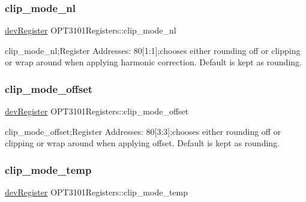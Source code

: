 \mbox{\label{class_o_p_t3101_registers_a8fe822abe308283298bd3fbbc718bedc}} 
\subsubsection{\texorpdfstring{clip\+\_\+mode\+\_\+nl}{clip\_mode\_nl}}
{\footnotesize\ttfamily \mbox{\hyperlink{classdev_register}{dev\+Register}} O\+P\+T3101\+Registers\+::clip\+\_\+mode\+\_\+nl}



clip\+\_\+mode\+\_\+nl;Register Addresses\+: 80\mbox{[}1\+:1\mbox{]};chooses either rounding off or clipping or wrap around when applying harmonic correction. Default is kept as rounding. 

\mbox{\label{class_o_p_t3101_registers_a4b970776cd18ff32126be0411e2a3acf}} 
\subsubsection{\texorpdfstring{clip\+\_\+mode\+\_\+offset}{clip\_mode\_offset}}
{\footnotesize\ttfamily \mbox{\hyperlink{classdev_register}{dev\+Register}} O\+P\+T3101\+Registers\+::clip\+\_\+mode\+\_\+offset}



clip\+\_\+mode\+\_\+offset;Register Addresses\+: 80\mbox{[}3\+:3\mbox{]};chooses either rounding off or clipping or wrap around when applying offset. Default is kept as rounding. 

\mbox{\label{class_o_p_t3101_registers_aaa1fef08b55df1b2d7a8743e31c4dc74}} 
\subsubsection{\texorpdfstring{clip\+\_\+mode\+\_\+temp}{clip\_mode\_temp}}
{\footnotesize\ttfamily \mbox{\hyperlink{classdev_register}{dev\+Register}} O\+P\+T3101\+Registers\+::clip\+\_\+mode\+\_\+temp}



